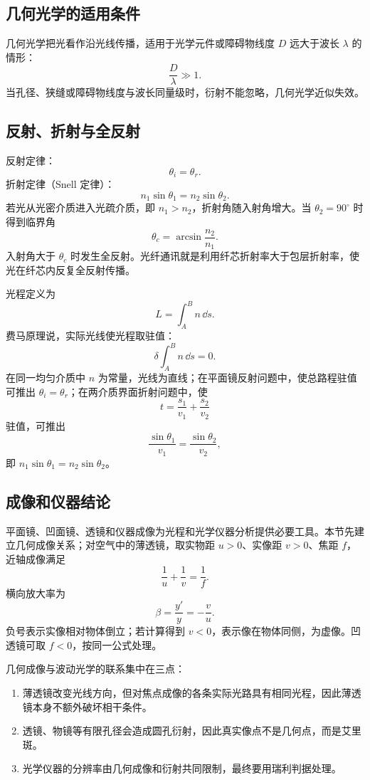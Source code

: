 \subsection*{几何光学的适用条件}

几何光学把光看作沿光线传播，适用于光学元件或障碍物线度 $D$ 远大于波长 $\lambda$ 的情形：
\[
  \frac{D}{\lambda}\gg1.
\]
当孔径、狭缝或障碍物线度与波长同量级时，衍射不能忽略，几何光学近似失效。

\subsection*{反射、折射与全反射}

反射定律：
\[
  \theta_i=\theta_r.
\]
折射定律（Snell 定律）：
\[
  n_1\sin\theta_1=n_2\sin\theta_2.
\]
若光从光密介质进入光疏介质，即 $n_1>n_2$，折射角随入射角增大。当 $\theta_2=90^\circ$ 时得到临界角
\[
  \theta_c=\arcsin\frac{n_2}{n_1}.
\]
入射角大于 $\theta_c$ 时发生全反射。光纤通讯就是利用纤芯折射率大于包层折射率，使光在纤芯内反复全反射传播。

\begin{method}[用费马原理理解反射和折射]
光程定义为
\[
  L=\int_A^B n\,\dd s.
\]
费马原理说，实际光线使光程取驻值：
\[
  \delta\int_A^B n\,\dd s=0.
\]
在同一均匀介质中 $n$ 为常量，光线为直线；在平面镜反射问题中，使总路程驻值可推出 $\theta_i=\theta_r$；在两介质界面折射问题中，使
\[
  t=\frac{s_1}{v_1}+\frac{s_2}{v_2}
\]
驻值，可推出
\[
  \frac{\sin\theta_1}{v_1}=\frac{\sin\theta_2}{v_2},
\]
即 $n_1\sin\theta_1=n_2\sin\theta_2$。
\end{method}

\subsection*{成像和仪器结论}

平面镜、凹面镜、透镜和仪器成像为光程和光学仪器分析提供必要工具。本节先建立几何成像关系；对空气中的薄透镜，取实物距 $u>0$、实像距 $v>0$、焦距 $f$，近轴成像满足
\[
  \frac1u+\frac1v=\frac1f.
\]
横向放大率为
\[
  \beta=\frac{y'}{y}=-\frac vu.
\]
负号表示实像相对物体倒立；若计算得到 $v<0$，表示像在物体同侧，为虚像。凹透镜可取 $f<0$，按同一公式处理。

几何成像与波动光学的联系集中在三点：
\begin{enumerate}
  \item 薄透镜改变光线方向，但对焦点成像的各条实际光路具有相同光程，因此薄透镜本身不额外破坏相干条件。
  \item 透镜、物镜等有限孔径会造成圆孔衍射，因此真实像点不是几何点，而是艾里斑。
  \item 光学仪器的分辨率由几何成像和衍射共同限制，最终要用瑞利判据处理。
\end{enumerate}

